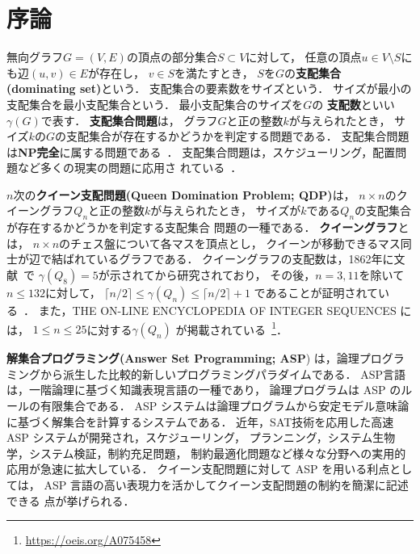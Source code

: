 \chapter{序論}\label{chap:introduction}

無向グラフ$G=(V,E)$の頂点の部分集合$S\subset V$に対して，
任意の頂点$u \in V\setminus S$にも辺$(u,v) \in E$が存在し，
$v \in S$を満たすとき，
$S$を$G$の\textbf{支配集合 (dominating set)}という．
支配集合の要素数をサイズという．
サイズが最小の支配集合を最小支配集合という．
最小支配集合のサイズを$G$の
\textbf{支配数}といい$\gamma(G)$で表す．
% 
\textbf{支配集合問題}は，
グラフ$G$と正の整数$k$が与えられたとき，
サイズ$k$の$G$の支配集合が存在するかどうかを判定する問題である．
支配集合問題は\textbf{NP完全}に属する問題である~\cite{Jhonson79}．
支配集合問題は，スケジューリング，配置問題など多くの現実の問題に応用さ
れている~\cite{Haynes98,Haynes98Advanced}．

$n$次の\textbf{クイーン支配問題(Queen Domination Problem; QDP)}は，
$n \times n$のクイーングラフ$Q_{n}$と正の整数$k$が与えられたとき，
サイズが$k$である$Q_{n}$の支配集合が存在するかどうかを判定する支配集合
問題の一種である．
\textbf{クイーングラフ}とは，
$n\times n$のチェス盤について各マスを頂点とし，
クイーンが移動できるマス同士が辺で結ばれているグラフである．
クイーングラフの支配数は，1862年に文献~\cite{Jaenisch62}で
$\gamma(Q_8)=5$が示されてから研究されており，
その後，$n=3,11$を除いて$n \leq 132$に対して，
$\lceil n/2 \rceil \leq \gamma(Q_n) \leq \lceil n/2 \rceil +1$
であることが証明されている~\cite{Ostergard01}．
また，THE ON-LINE ENCYCLOPEDIA OF INTEGER SEQUENCES には，
$1\leq n\leq 25$に対する$\gamma(Q_n)$
が掲載されている~\footnote{\url{https://oeis.org/A075458}}．

\textbf{解集合プログラミング(Answer Set Programming; ASP}\cite{%
  Baral03:cambridge,%
  Gelfond88:iclp,%
  Inoue08:jssst,%
  Niemela99:amai})
は，論理プログラミングから派生した比較的新しいプログラミングパラダイムである．
ASP言語は，一階論理に基づく知識表現言語の一種であり，
論理プログラムは ASP のルールの有限集合である．
ASP システムは論理プログラムから安定モデル意味論に基づく解集合を計算するシステムである．
近年，SAT技術を応用した高速 ASP システムが開発され，スケジューリング，
プランニング，システム生物学，システム検証，制約充足問題，
制約最適化問題など様々な分野への実用的応用が急速に拡大している．
クイーン支配問題に対して ASP を用いる利点としては，
ASP 言語の高い表現力を活かしてクイーン支配問題の制約を簡潔に記述できる
点が挙げられる．

